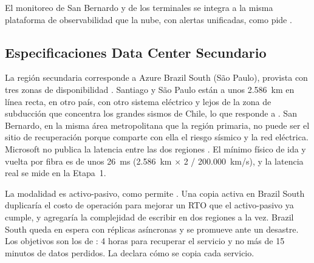 El monitoreo de San Bernardo y de los terminales se integra a la misma plataforma de observabilidad que
la nube, con alertas unificadas, como pide .

\subsection{Especificaciones Data Center Secundario}\label{sec:4-dc-secundario}

La región secundaria corresponde a Azure Brazil South (São Paulo), provista con tres zonas
de disponibilidad \parencite{ms_regions}. Santiago y São Paulo están a unos 2.586~km en línea recta, en
otro país, con otro sistema eléctrico y lejos de la zona de subducción que concentra los grandes
sismos de Chile, lo que responde a . San Bernardo, en la misma área metropolitana
que la región primaria, no puede ser el sitio de recuperación porque comparte con ella el riesgo
sísmico y la red eléctrica. Microsoft no publica la latencia entre las dos regiones
\parencite{ms_latencia}. El mínimo físico de ida y vuelta por fibra es de unos 26~ms (2.586~km × 2 /
200.000~km/s), y la latencia real se mide en la Etapa~1.

La modalidad es activo-pasivo, como permite . Una copia activa en Brazil South
duplicaría el costo de operación para mejorar un RTO que el activo-pasivo ya cumple, y agregaría la
complejidad de escribir en dos regiones a la vez. Brazil South queda en espera con réplicas asíncronas y
se promueve ante un desastre. Los objetivos son los de : 4 horas para recuperar el
servicio y no más de 15 minutos de datos perdidos. La  declara cómo se copia cada
servicio.

